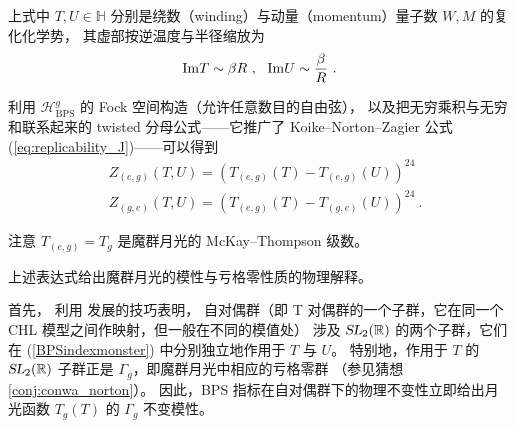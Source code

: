 \documentclass[11pt,a4paper,fontset=windows]{ctexart}
\numberwithin{equation}{section}
\newcommand{\SL}{\operatorname{\textsl{SL}}}      %
\newcommand{\RR}{\mathbb{R}}
\newcommand{\HH}{\mathbb{H}}
\def\im{\mathrm{Im}}
\newcommand{\be}{\begin{equation}}
\newcommand{\ee}{\end{equation}}
\newcommand{\eq}[1]{(\ref{#1})}
\begin{document}

上式中 $T,U\in \HH$ 分别是绕数（winding）与动量（momentum）量子数 $W,M$ 的复化化学势，
其虚部按逆温度与半径缩放为
\be
\im T \sim {\beta R}~,~~ \im U \sim {\beta \over R}~.
\ee


利用 $\mathcal{H}^g_{\text{BPS}}$ 的 Fock 空间构造（允许任意数目的自由弦），
以及把无穷乘积与无穷和联系起来的 twisted 分母公式——它推广了 Koike–Norton–Zagier 公式 \eq{eq:replicability_J}——可以得到
\begin{equation}\label{BPSindexmonster}
\begin{split}
&Z_{(e,g)}(T,U)=\left(T_{(e,g)}(T)-T_{(e,g)}(U)\right)^{24} \\
&Z_{(g,e)}(T,U)=\left(T_{(e,g)}(T)-T_{(g,e)}(U)\right)^{24}~.
\end{split}
\end{equation}



注意 $T_{(e,g)}=T_g$ 是魔群月光的 McKay–Thompson 级数。

上述表达式给出魔群月光的模性与亏格零性质的物理解释。


首先，\cite{paquette2016monstrous} 利用 \cite{Persson:2015jka} 发展的技巧表明，
自对偶群（即 T 对偶群的一个子群，它在同一个 CHL 模型之间作映射，但一般在不同的模值处）
涉及 $\SL_2(\RR)$ 的两个子群，它们在 \eq{BPSindexmonster} 中分别独立地作用于 $T$ 与 $U$。
特别地，作用于 $T$ 的 $\SL_2(\RR)$ 子群正是 $\Gamma_g$，即魔群月光中相应的亏格零群
（参见猜想 \ref{conj:conwa_norton}）。
因此，BPS 指标在自对偶群下的物理不变性立即给出月光函数 $T_{g}(T)$ 的 $\Gamma_g$ 不变模性。
\end{document}
